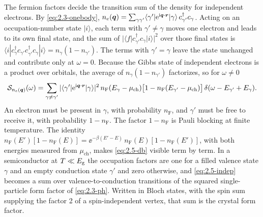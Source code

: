The fermion factors decide the transition sum of the density for independent electrons. By \cref{eq:2.3-onebody}, $n_e(\bm{q}) = \sum_{\gamma\gamma'}\langle\gamma'|\mathrm{e}^{\mathrm{i}\bm{q}\cdot\bm{r}}|\gamma\rangle\,c^\dagger_{\gamma'}c_\gamma$. Acting on an occupation-number state $|i\rangle$, each term with $\gamma' \ne \gamma$ moves one electron and leads to its own final state, and the sum of $|\langle f|c^\dagger_{\gamma'}c_\gamma|i\rangle|^2$ over those final states is $\langle i|c^\dagger_\gamma c_{\gamma'}c^\dagger_{\gamma'}c_\gamma|i\rangle = n_\gamma(1 - n_{\gamma'})$. The terms with $\gamma' = \gamma$ leave the state unchanged and contribute only at $\omega = 0$. Because the Gibbs state of independent electrons is a product over orbitals, the average of $n_\gamma(1 - n_{\gamma'})$ factorizes, so for $\omega \ne 0$
\begin{equation}
  \mathcal{S}_{n_e(\bm{q})}(\omega) = \sum_{\gamma\ne\gamma'}|\langle\gamma'|\mathrm{e}^{\mathrm{i}\bm{q}\cdot\bm{r}}|\gamma\rangle|^2\,n_{\mathrm{F}}(E_\gamma - \mu_{\mathrm{ch}})\bigl[1 - n_{\mathrm{F}}(E_{\gamma'} - \mu_{\mathrm{ch}})\bigr]\,\delta(\omega - E_{\gamma'} + E_\gamma) .
  \label{eq:2.5-indep}
\end{equation}
An electron must be present in $\gamma$, with probability $n_{\mathrm{F}}$, and $\gamma'$ must be free to receive it, with probability $1 - n_{\mathrm{F}}$. The factor $1 - n_{\mathrm{F}}$ is Pauli blocking at finite temperature. The identity $n_{\mathrm{F}}(E')[1 - n_{\mathrm{F}}(E)] = \ee^{-\beta(E' - E)}\,n_{\mathrm{F}}(E)[1 - n_{\mathrm{F}}(E')]$, with both energies measured from $\mu_{\mathrm{ch}}$, makes \cref{eq:2.5-db} visible term by term. In a semiconductor at $T \ll E_{\mathrm{g}}$ the occupation factors are one for a filled valence state $\gamma$ and an empty conduction state $\gamma'$ and zero otherwise, and \cref{eq:2.5-indep} becomes a sum over valence-to-conduction transitions of the squared single-particle form factor of \cref{eq:2.3-ph}. Written in Bloch states, with the spin sum supplying the factor 2 of a spin-independent vertex, that sum is the crystal form factor.

